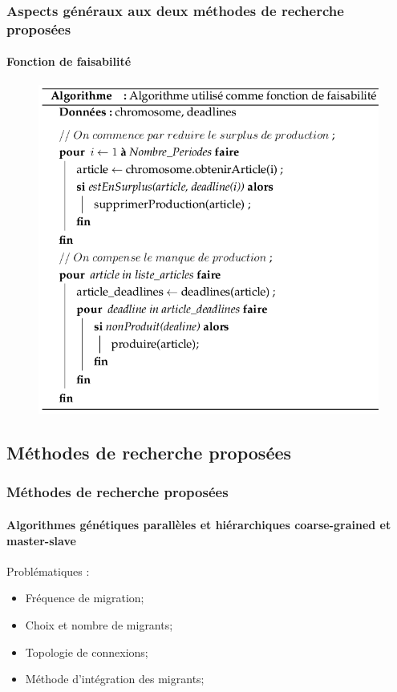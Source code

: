 \documentclass[11pt]{beamer}
\begin{document}
 \begin{frame}
 \frametitle{Aspects généraux aux deux méthodes de recherche proposées}
 \framesubtitle{Fonction de faisabilité}
	
	\begin{figure}[!h]
		\begin{center}
			\includegraphics[scale=.4
			]{img/faisabilite_algo.png}
		\end{center}
 \end{figure}
	
 \end{frame}
 
 
 
 \subsection{Méthodes de recherche proposées}
 
 \begin{frame}
 \frametitle{Méthodes de recherche proposées}
 \framesubtitle{Algorithmes génétiques parallèles et hiérarchiques coarse-grained et
master-slave}
	
	Problématiques :
	\begin{itemize}
		\item Fréquence de migration;
		\item Choix et nombre de migrants;
		\item Topologie de connexions;
		\item Méthode d’intégration des migrants;
	\end{itemize}
	
 \end{frame}
 
\end{document}
